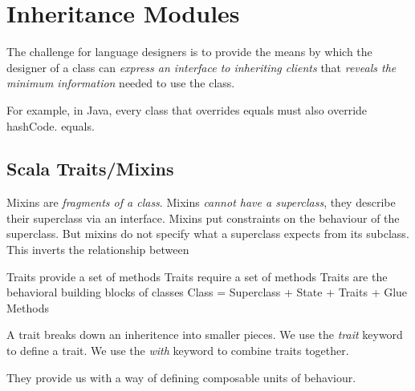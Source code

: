 
\chapter{Inheritance Modules}

The challenge for language designers is to provide the means by which the designer 
of a class can  \textit{express an interface to inheriting clients} 
that \textit{reveals the minimum information} needed to use the class.



For example, in Java, every class that overrides equals must also override hashCode.
equals.



\section{Scala Traits/Mixins}


Mixins are \textit{fragments of a class}.
Mixins \textit{cannot have a superclass}, they describe their superclass via an 
interface. Mixins put constraints on the behaviour of the superclass. 
But mixins do not specify what a superclass expects
from its subclass. This inverts the relationship between 

Traits provide a set of methods 
Traits require a set of methods
Traits are the behavioral building blocks of classes
Class = Superclass + State + Traits + Glue Methods

A trait breaks down an inheritence into smaller pieces.
We use the \textit{trait} keyword to define a trait.
We use the \textit{with} keyword to combine traits together. 

They provide us with a way of defining composable units of behaviour.

